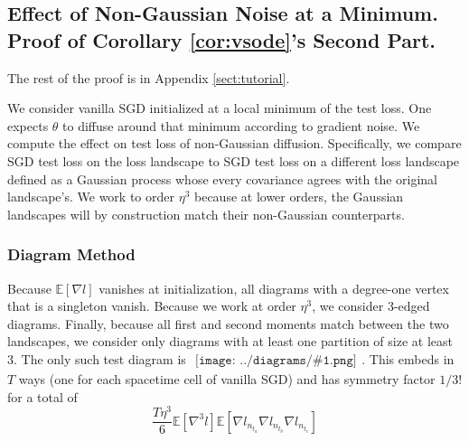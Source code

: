 \documentclass{article}
\theoremstyle{plain}
\theoremstyle{definition}
\newcommand{\expct}[1]{\mathbb{E}\left[#1\right]}
\newcommand{\sdia}[1]{\begin{gathered}\texttt{[image: ../diagrams/\#1.png]}\end{gathered}}
\begin{document}
    \subsection{
        Effect of Non-Gaussian Noise at a Minimum.
        Proof of Corollary \ref{cor:vsode}'s Second Part.
    }
        The rest of the proof is in Appendix \ref{sect:tutorial}.

        We consider vanilla SGD initialized at a local minimum of the test loss.
        One expects $\theta$ to diffuse around that minimum according to
        gradient noise.  We compute the effect on test loss of non-Gaussian
        diffusion.  Specifically, we compare SGD test loss on the loss
        landscape to SGD test loss on a different loss landscape defined as a
        Gaussian process whose every covariance agrees with the original
        landscape's.  We work to order $\eta^3$ because at lower orders,
        the Gaussian landscapes will by construction match their non-Gaussian
        counterparts.

        \subsubsection*{Diagram Method}
        \begin{shaded}
            Because $\expct{\nabla l}$ vanishes at initialization, all diagrams
            with a degree-one vertex that is a singleton vanish.  Because we
            work at order $\eta^3$, we consider $3$-edged diagrams.  Finally,
            because all first and second moments match between the two
            landscapes, we consider only diagrams with at least one partition
            of size at least $3$.  The only such test diagram is
            $\sdia{c(012-3)(03-13-23)}$.  This embeds in $T$ ways (one for each
            spacetime cell of vanilla SGD) and has symmetry factor $1/3!$ for a
            total of
            $$
                \frac{T \eta^3 }{6}
                \expct{\nabla^3 l}
                \expct{\nabla l_{n_{t_a}} \nabla l_{n_{t_b}} \nabla l_{n_{t_c}}}
            $$
        \end{shaded}
\end{document}
